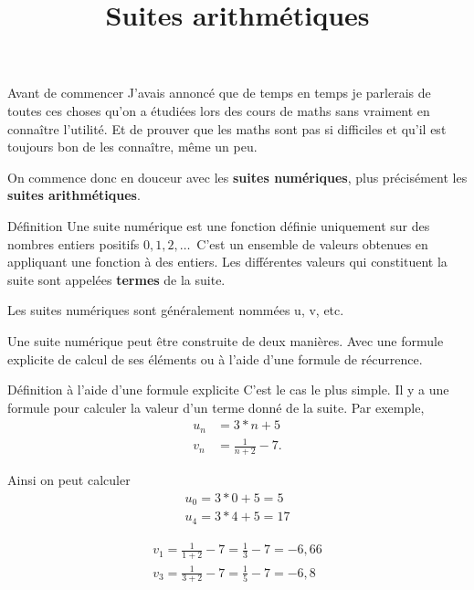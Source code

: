 \documentclass{beamer}
\title{Suites arithmétiques}
\author{}
\date{}
\begin{document}
\begin{frame}
  \titlepage
\end{frame}

\begin{frame}{Avant de commencer}
  J'avais annoncé que de temps en temps je parlerais de toutes ces choses qu'on a étudiées lors des cours de maths sans vraiment en connaître l'utilité. Et de prouver que les maths sont pas si difficiles et qu'il est toujours bon de les connaître, même un peu.

  On commence donc en douceur avec les \textbf{suites numériques}, plus précisément les \textbf{suites arithmétiques}.

  \begin{center}
    \Cooley[2][cyan]
  \end{center}
\end{frame}

\begin{frame}{Définition}
  Une suite numérique est une fonction définie uniquement sur des nombres entiers positifs $0, 1, 2, \dots$\ C'est un ensemble de valeurs obtenues en appliquant une fonction à des entiers. Les différentes valeurs qui constituent la suite sont appelées \textbf{termes} de la suite.

  Les suites numériques sont généralement nommées u, v, etc.

  Une suite numérique peut être construite de deux manières. Avec une formule explicite de calcul de ses éléments ou à l'aide d'une formule de récurrence.
\end{frame}

\begin{frame}{Définition à l'aide d'une formule explicite}
  C'est le cas le plus simple. Il y a une formule pour calculer la valeur d'un terme donné de la suite. Par exemple,
  \begin{align*}
    u_n &= 3 * n + 5 \\
    v_n &= \frac{1}{n+2} - 7.   
  \end{align*}

  Ainsi on peut calculer
  \begin{gather*}
    u_0 = 3 * 0 + 5 = 5 \\
    u_4 = 3 * 4 + 5 = 17
  \end{gather*}

  \begin{gather*}
    v_1 = \frac{1}{1+2} - 7 = \frac{1}{3} - 7 = -6,66 \\
    v_3 = \frac{1}{3+2} - 7 = \frac{1}{5} - 7 = -6,8
  \end{gather*}
\end{frame}
\end{document}
